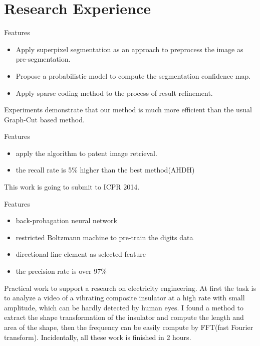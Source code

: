 \documentclass[11pt,a4paper, sans]{moderncv} %
\begin{document}
\section{Research Experience}
{
Features
\begin{itemize}
\item Apply superpixel segmentation as an approach to preprocess the image as pre-segmentation.
\item Propose a probabilistic model to compute the segmentation confidence map.
\item Apply sparse coding method to the process of result refinement.
\end{itemize}
Experiments demonstrate that our method is much more efficient than the usual  Graph-Cut based method.
}
{
Features
\begin{itemize}
\item apply the algorithm to patent image retrieval.
\item the recall rate is 5\% higher than the best method(AHDH)
\end{itemize}
This work is going to submit to ICPR 2014.
}
{
Features
\begin{itemize}
\item back-probagation neural network
\item restricted Boltzmann machine to pre-train the digits data
\item directional line element as selected feature
\item the precision rate is over 97\% 
\end{itemize}
}
{
Practical work to support a research on electricity engineering. At first the task is to analyze a video of a vibrating composite insulator at a high rate with small amplitude, which can be hardly detected by human eyes. I found a method to extract the shape transformation of the insulator and compute the length and area of the shape, then the frequency can be easily compute by FFT(fast Fourier transform). Incidentally, all these work is finished in 2 hours.
}
\end{document}
